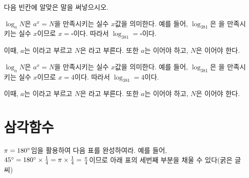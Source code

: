 \documentclass[a4paper]{oblivoir}
\begin{document}
\begin{Exercise}
다음 빈칸에 알맞은 말을 써넣으시오.
\begin{mdframed}
\(\log_aN\)은
\(a^x=N\)을 만족시키는 실수 \(x\)값을 의미한다.
예를 들어, \(\log_381\)은
을 만족시키는 실수 \(x\)이므로 \(x=\square\)이다.
따라서 \(\log_381=\square\)이다.

이때, \(a\)는 이라고 부르고 \(N\)은 라고 부른다.
또한 \(a\)는 이어야 하고, \(N\)은 이어야 한다.
\end{mdframed}
\end{Exercise}

\begin{Answer}
\(\log_aN\)은
\(a^x=N\)을 만족시키는 실수 \(x\)값을 의미한다.
예를 들어, \(\log_381\)은
을 만족시키는 실수 \(x\)이므로 \(x=4\)이다.
따라서 \(\log_381=4\)이다.

이때, \(a\)는 이라고 부르고 \(N\)은 라고 부른다.
또한 \(a\)는 이어야 하고, \(N\)은 이어야 한다.
\end{Answer}

\section{삼각함수}

\begin{Exercise}
\(\pi=180\degree\)임을 활용하여 다음 표를 완성하여라.
예를 들어, \(45\degree=180\degree\times\frac14=\pi\times\frac14=\frac\pi4\)이므로 아래 표의 세번째 부분을 채울 수 있다(굵은 글씨)
\par\bigskip\noindent
{}
\end{Exercise}

\begin{Answer}
\par\bigskip\noindent
{}
\end{Answer}
\end{document}
